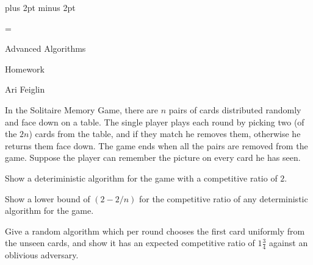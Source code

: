 

\parindent=0pt
\parskip=4pt plus 2pt minus 2pt



\footline={}

\setcounter{section}{3}


\def\printmcount{\the\counter{section}.\the\counter{math counter}}

{

    \centerline{Advanced Algorithms}
    \smallskip
    \centerline{Homework \the{}}
    \centerline{Ari Feiglin}

\eppbox}

\bexerc

    In the Solitaire Memory Game, there are $n$ pairs of cards distributed randomly and face down on a table.
    The single player plays each round by picking two (of the $2n$) cards from the table, and if they match he removes them, otherwise he returns them face down.
    The game ends when all the pairs are removed from the game.
    Suppose the player can remember the picture on every card he has seen.
    \benum
        \item Show a deteriministic algorithm for the game with a competitive ratio of $2$.
        \item Show a lower bound of $(2-2/n)$ for the competitive ratio of any deterministic algorithm for the game.
        \item Give a random algorithm which per round chooses the first card uniformly from the unseen cards, and show it has an expected competitive ratio of $1\frac34$ against an oblivious adversary.
    \eenum

\eexerc


